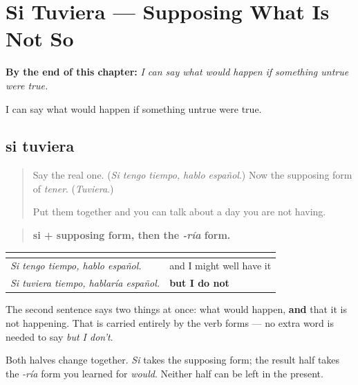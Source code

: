 
\chapter{Si Tuviera --- Supposing What Is Not So}
\label{ch:si-tuviera}

\begin{chapteropening}
\textbf{By the end of this chapter:} \emph{I can say what would happen if something untrue were true.}

I can say what would happen if something untrue were true.
\end{chapteropening}

\section[si tuviera]{si tuviera}

\label{lesson:ES-C56-si-tuviera}



\begin{quote}
Say the real one. (\emph{Si tengo tiempo, hablo español}.) Now the supposing form of \emph{tener}. (\emph{Tuviera}.)

Put them together and you can talk about a day you are not having.
\end{quote}

\begin{grammarlens}[title={Grammar Lens: the world that is not the case}]
\begin{quote}
\textbf{si + supposing form, then the \emph{-ría} form.}
\end{quote}

\noindent
\begin{tabularx}{\linewidth}{@{}>{\raggedright\arraybackslash}X>{\raggedright\arraybackslash}X@{}}
\toprule
\textbf{} & \textbf{} \\
\midrule
\emph{Si tengo tiempo, hablo español.} & and I might well have it \\
\emph{Si tuviera tiempo, hablaría español.} & \textbf{but I do not} \\
\bottomrule
\end{tabularx}

The second sentence says two things at once: what would happen, \textbf{and} that it is not happening. That is carried entirely by the verb forms — no extra word is needed to say \emph{but I don't}.

Both halves change together. \emph{Si} takes the supposing form; the result half takes the \emph{-ría} form you learned for \emph{would}. Neither half can be left in the present.
\end{grammarlens}

